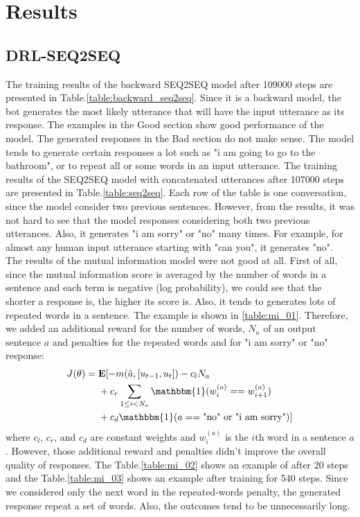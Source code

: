 \documentclass[letterpaper]{article}
\begin{document}
\section{Results}
\subsection{DRL-SEQ2SEQ}
The training results of the backward SEQ2SEQ model after 109000 steps are presented in Table.\ref{table:backward_seq2seq}. Since it is a backward model, the bot generates the most likely utterance that will have the input utterance as its response. The examples in the Good section show good performance of the model. The generated responses in the Bad section do not make sense. The model tends to generate certain responses a lot such as "i am going to go to the bathroom", or to repeat all or some words in an input utterance. The training results of the SEQ2SEQ model with concatenated utterances after 107000 steps are presented in Table.\ref{table:seq2seq}. Each row of the table is one conversation, since the model consider two previous sentences. However, from the results, it was not hard to see that the model responses considering both two previous utterances. Also, it generates "i am sorry" or "no" many times. For example, for almost any human input utterance starting with "can you", it generates "no". \\
The results of the mutual information model were not good at all. First of all, since the mutual information score is averaged by the number of words in a sentence and each term is negative (log probability), we could see that the shorter a response is, the higher its score is. Also, it tends to generates lots of repeated words in a sentence. The example is shown in \ref{table:mi_01}. Therefore, we added an additional reward for the number of words, $N_a$ of an output sentence $a$ and penalties for the repeated words and for "i am sorry" or "no" response:
\begin{align}
    J(\theta) =&\; \mathbf{E} [-m(\hat{a},[u_{t-1},u_t])-c_l N_a \nonumber \\
     &\; + c_r \sum_{1\leq i < N_a} \mathbbm{1}(w_i^{(a)} == w_{i+1}^{(a)}) \nonumber \\ 
     &\; +c_d \mathbbm{1}(a == \text{"no" or "i am sorry"})]
\end{align}
where $c_l$, $c_r$, and $c_d$ are constant weights and $w_i^{(a)}$ is the $i$th word in a sentence $a$. However, those additional reward and penalties didn't improve the overall quality of responses. The Table.\ref{table:mi_02} shows an example of after 20 steps and the Table.\ref{table:mi_03} shows an example after training for 540 steps. Since we considered only the next word in the repeated-words penalty, the generated response repeat a set of words. Also, the outcomes tend to be unnecessarily long.
\end{document}
